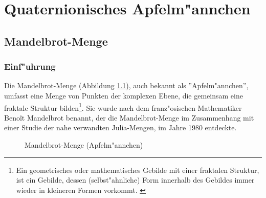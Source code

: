 \chapter{Quaternionisches Apfelm"annchen}
\begin{refsection}

\section{Mandelbrot-Menge}

\subsection{Einf"uhrung}
Die Mandelbrot-Menge (Abbildung \ref{fig. appleman}), auch bekannt als
''Apfelm"annchen'', umfasst eine Menge von Punkten der komplexen Ebene,
die gemeinsam eine fraktale Struktur bilden\footnote{Ein geometrisches
oder mathematisches Gebilde mit einer fraktalen Struktur, ist ein
Gebilde,  dessen (selbst"ahnliche) Form innerhalb des Gebildes immer
wieder in kleineren Formen vorkommt. \cite{fraktal}}. Sie wurde nach
dem franz"osischen Mathematiker Beno\^it Mandelbrot benannt, der die
Mandelbrot-Menge im Zusammenhang mit einer Studie der nahe verwandten
Julia-Mengen, im Jahre 1980 entdeckte. \cite{wiki}\\[-0.95cm]
\begin{figure}[ht!]\centering
\begin{adjustbox}{scale=0.45, keepaspectratio}
	
\end{adjustbox}
\caption{Mandelbrot-Menge (Apfelm"annchen)}
\label{fig. appleman}
\end{figure}


\end{refsection}
